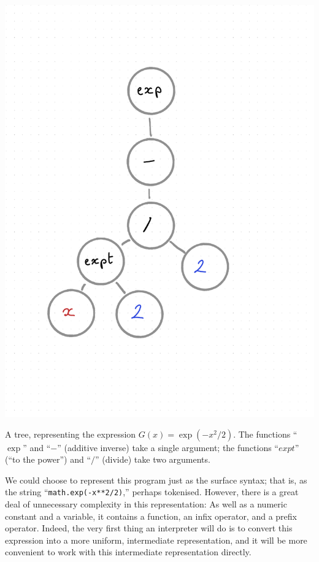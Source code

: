\documentclass[11pt, a4paper]{article}
\begin{document}
\begin{marginfigure}
  \centering
  \includegraphics[width=0.8\marginparwidth]{images/expr-gauss.pdf}
  \caption{A tree, representing the expression $G(x) =
    \exp(-x^2/2)$. The functions ``$\exp$'' and ``$-$'' (additive
    inverse) take a single argument; the functions ``$expt$'' (``to
    the power'') and ``$/$'' (divide) take two
    arguments.\label{fig:expression-tree-gaussian}}
\end{marginfigure}
We could choose to represent this program just as the surface syntax;
that is, as the string ``\texttt{math.exp(-x**2/2)},''
perhaps tokenised. However, there is a great deal of unnecessary
complexity in this representation: As well as a numeric constant and a
variable, it contains a function, an infix operator, and a prefix
operator. Indeed, the very first thing an interpreter will do is to
convert this expression into a more uniform, intermediate
representation, and it will be more convenient to work with this
intermediate representation directly.
\end{document}
